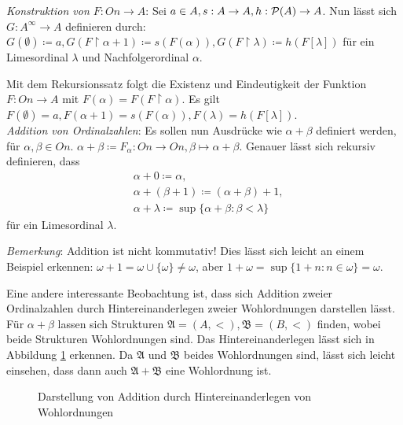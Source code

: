 \textit{Konstruktion von $F:On\to A$}: Sei $a\in A,s:A\to A, h: \mathcal{P}(A)\to A$. Nun lässt sich $G:A^\infty\to A$ definieren durch: $G(\emptyset)\coloneqq a, G(F\upharpoonright\alpha+1)\coloneqq s(F(\alpha)), G(F\upharpoonright\lambda)\coloneqq h(F[\lambda])$ für ein Limesordinal $\lambda$ und Nachfolgerordinal $\alpha$.

Mit dem Rekursionssatz folgt die Existenz und Eindeutigkeit der Funktion $F:On\to A$ mit $F(\alpha)=F(F\upharpoonright\alpha)$. Es gilt $F(\emptyset)=a, F(\alpha+1)=s(F(\alpha)), F(\lambda)=h(F[\lambda])$.\\

\textit{Addition von Ordinalzahlen}: Es sollen nun Ausdrücke wie $\alpha+\beta$ definiert werden, für $\alpha,\beta\in On$. $\alpha+\beta\coloneqq F_\alpha:On\to On, \beta\mapsto\alpha+\beta$. 
Genauer lässt sich rekursiv definieren, dass 
\begin{align*}
	&\alpha+0\coloneqq\alpha,\\
	&\alpha+(\beta+1)\coloneqq(\alpha+\beta)+1,\\ 
	&\alpha+\lambda\coloneqq\sup\{\alpha+\beta : \beta < \lambda\}
\end{align*}
für ein Limesordinal $\lambda$.

\textit{Bemerkung}: Addition ist nicht kommutativ! Dies lässt sich leicht an einem Beispiel erkennen: $\omega+1=\omega\cup\{\omega\}\neq\omega$, aber $1+\omega=\sup\{1+n:n\in\omega\}=\omega$.

Eine andere interessante Beobachtung ist, dass sich Addition zweier Ordinalzahlen durch \glqq Hintereinanderlegen\grqq{} zweier Wohlordnungen darstellen lässt. Für $\alpha+\beta$ lassen sich Strukturen $\mathfrak{A}=(A,<), \mathfrak{B}=(B,<)$ finden, wobei beide Strukturen Wohlordnungen sind. Das \glqq Hintereinanderlegen\grqq{} lässt sich in Abbildung \ref{AdditionWO} erkennen. Da $\mathfrak{A}$ und $\mathfrak{B}$ beides Wohlordnungen sind, lässt sich leicht einsehen, dass dann auch $\mathfrak{A}+\mathfrak{B}$ eine Wohlordnung ist.
	
\begin{figure}[h]
	\begin{center}
	\end{center}
	\caption{Darstellung von Addition durch \glqq Hintereinanderlegen\grqq{} von Wohlordnungen}
	\label{AdditionWO}
\end{figure}

